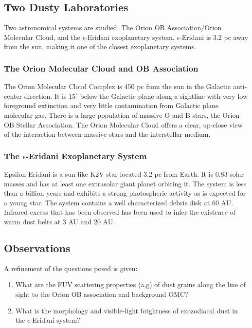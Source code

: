 \documentclass[oneside]{book}
\theoremstyle{definition}
\numberwithin{equation}{section}
\begin{document}
\subsection{Two Dusty Laboratories}

Two astronomical systems are studied: The Orion OB Association/Orion Molecular Cloud, and the $\epsilon$-Eridani exoplanetary system. $\epsilon$-Eridani is $3.2$ pc away from the sun, making it one of the closest exoplanetary systems. 

\subsubsection{The Orion Molecular Cloud and OB Association}

The Orion Molecular Cloud Complex is 450 pc from the sun in the Galactic anti-center direction. It is $15^{\circ}$ below the Galactic plane along a sightline with very low foreground extinction and very little contamination from Galactic plane molecular gas. There is a large population of massive O and B stars, the Orion OB Stellar Association. The Orion Molecular Cloud offers a clear, up-close view of the interaction between massive stars and the interstellar medium. 

\subsubsection{The $\epsilon$-Eridani Exoplanetary System}

Epsilon Eridani is a sun-like K2V star located 3.2 pc from Earth. It is 0.83 solar masses and has at least one extrasolar giant planet orbiting it. The system is less than a billion years and exhibits a strong photospheric activity as is expected for a young star. The system contains a well characterized debris disk at 60 AU. Infrared excess that has been observed has been used to infer the existence of warm dust belts at 3 AU and 20 AU. 

\subsection{Observations}

A refinement of the questions posed is given:

\begin{enumerate}
\item What are the FUV scattering properties (a,g) of dust grains along the line of sight to the Orion OB association and background OMC?
\item What is the morphology and visible-light brightness of exozodiacal dust in the $\epsilon$-Eridani system?
\end{enumerate}
\end{document}
